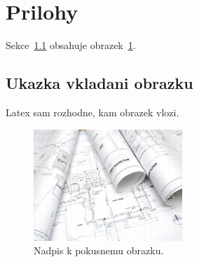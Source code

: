 \section{Prilohy}

Sekce~\ref{sec:ukazkaObrazku} obsahuje obrazek~\ref{fig:testObrazek}.

\subsection{Ukazka vkladani obrazku}
\label{sec:ukazkaObrazku}

Latex sam rozhodne, kam obrazek vlozi.

\begin{figure}[t]
  \centering
  \includegraphics[width=0.5\textwidth]{obrazky/test.jpg}
  \caption{Nadpis k pokusnemu obrazku.}
  \label{fig:testObrazek}
\end{figure}
